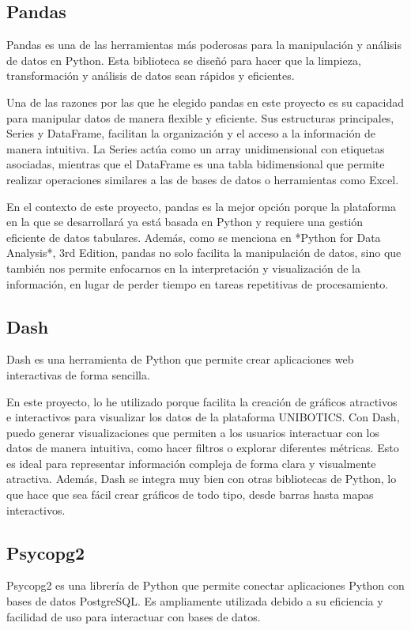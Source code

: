 \documentclass[a4paper, 12pt]{book}
\begin{document}
\subsection{Pandas}\label{subsec:pandas}
Pandas es una de las herramientas más poderosas para la manipulación y análisis de datos en Python. Esta biblioteca se diseñó para hacer que la limpieza, transformación y análisis de datos sean rápidos y eficientes.

Una de las razones por las que he elegido pandas en este proyecto es su capacidad para manipular datos de manera flexible y eficiente. Sus estructuras principales, Series y DataFrame, facilitan la organización y el acceso a la información de manera intuitiva. La Series actúa como un array unidimensional con etiquetas asociadas, mientras que el DataFrame es una tabla bidimensional que permite realizar operaciones similares a las de bases de datos o herramientas como Excel.

En el contexto de este proyecto, pandas es la mejor opción porque la plataforma en la que se desarrollará ya está basada en Python y requiere una gestión eficiente de datos tabulares. Además, como se menciona en *Python for Data Analysis*, 3rd Edition, pandas no solo facilita la manipulación de datos, sino que también nos permite enfocarnos en la interpretación y visualización de la información, en lugar de perder tiempo en tareas repetitivas de procesamiento.

\subsection{Dash}\label{subsec:dash}
Dash es una herramienta de Python que permite crear aplicaciones web interactivas de forma sencilla. 

En este proyecto, lo he utilizado porque facilita la creación de gráficos atractivos e interactivos para visualizar los datos de la plataforma UNIBOTICS. Con Dash, puedo generar visualizaciones que permiten a los usuarios interactuar con los datos de manera intuitiva, como hacer filtros o explorar diferentes métricas. Esto es ideal para representar información compleja de forma clara y visualmente atractiva. Además, Dash se integra muy bien con otras bibliotecas de Python, lo que hace que sea fácil crear gráficos de todo tipo, desde barras hasta mapas interactivos.

\subsection{Psycopg2}\label{subsec:psycopg2}
Psycopg2 es una librería de Python que permite conectar aplicaciones Python con bases de datos PostgreSQL. Es ampliamente utilizada debido a su eficiencia y facilidad de uso para interactuar con bases de datos. 
\end{document}
